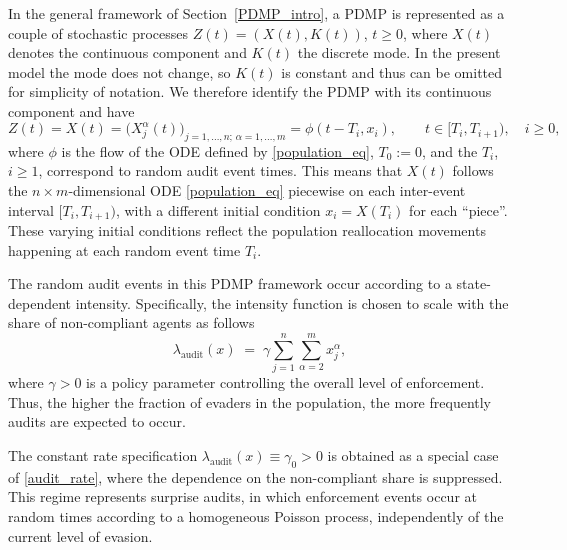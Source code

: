 \documentclass[11pt]{article}
\theoremstyle{plain}
\theoremstyle{definition}
\newcommand{\1}{\mathbf{1}}
\begin{document}
In the general framework of Section~\ref{PDMP_intro}, a PDMP is represented as a couple of stochastic processes $Z(t) = (X(t),K(t))$, $t\geq 0$, where $X(t)$ denotes the continuous component and $K(t)$ the discrete mode. 
In the present model the mode does not change, so $K(t)$ is constant and thus can be omitted for simplicity of notation. We therefore identify the PDMP with its continuous component and have 
\begin{equation*}
  Z(t) = X(t) = \bigl(X_j^\alpha(t)\bigr)_{j=1,\dots,n;\,\alpha=1,\dots,m}  = \phi(t-T_i, x_i), \qquad t \in [T_i,T_{i+1}), \quad i\geq 0,
\end{equation*}
where $\phi$ is the flow of the ODE defined by \eqref{population_eq}, $T_0:=0$, and the $T_i$, $i\geq 1$, correspond to random audit event times. This means that $X(t)$ follows the $n\times m$-dimensional ODE \eqref{population_eq} piecewise on each inter-event interval $[T_i,T_{i+1})$, with a different initial condition $x_i=X(T_i)$ for each ``piece''. These varying initial conditions reflect the population reallocation movements happening at each random event time $T_i$.  

The random audit events in this PDMP framework occur according to a state-dependent intensity. Specifically, the intensity function is chosen to scale with the share of non-compliant agents as follows
\begin{equation}\label{audit_rate}
  \lambda_{\text{audit}}(x) \;=\; \gamma \sum_{j=1}^n \sum_{\alpha=2}^m x_j^\alpha, 
\end{equation}
where $\gamma>0$ is a policy parameter controlling the overall level of enforcement. Thus, the higher the fraction of evaders in the population, the more frequently audits are expected to occur. 

The constant rate specification $\lambda_{\text{audit}}(x)\equiv \gamma_0>0$ is obtained as a special case of \eqref{audit_rate}, where the dependence on the non-compliant share is suppressed. This regime represents surprise audits, in which enforcement events occur at random times according to a homogeneous Poisson process, independently of the current level of evasion.
\end{document}
